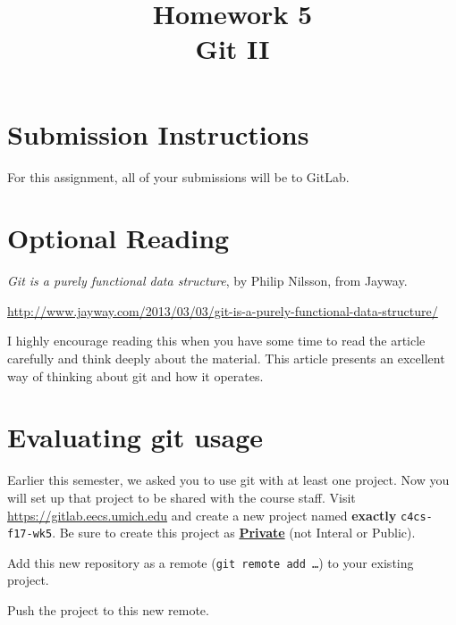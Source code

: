 \documentclass{article}
\begin{document}
\fancyhead[L]{}
\fancyhead[R]{}

\fancyfoot[C]{\color{gray} \thepage~/~\pageref*{LastPage}}
\pagestyle{fancyplain}

\title{\textbf{Homework 5\\Git II}}
\author{\textbf{\color{red}{Due: Friday, October 20th, 11:59PM (Hard Deadline)}}}
\date{}
\maketitle


\section*{Submission Instructions}
For this assignment, all of your submissions will be to GitLab.


\section*{Optional Reading}

\emph{Git is a purely functional data structure}, by Philip Nilsson, from Jayway.

\url{http://www.jayway.com/2013/03/03/git-is-a-purely-functional-data-structure/}

I highly encourage reading this when you have some time to read the article
carefully and think deeply about the material.
This article presents an excellent way of thinking about git and how it
operates.



\section{Evaluating git usage}

Earlier this semester, we asked you to use git with at least one project. Now
you will set up that project to be shared with the course staff. Visit
\url{https://gitlab.eecs.umich.edu} and create a new project named
\textbf{exactly} \texttt{c4cs-f17-wk5}.
Be sure to create this project as
\textbf{\ul{Private}} (not Interal or Public).

Add this new repository as a remote (\texttt{git remote add \dots}) to your
existing project.

Push the project to this new remote.
\end{document}
